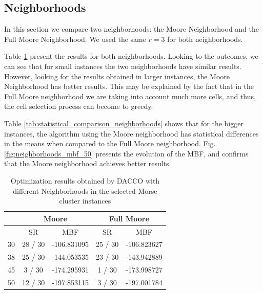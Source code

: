 		\subsection{Neighborhoods}
		
		In this section we compare two neighborhoods: the Moore Neighborhood and the Full Moore Neighborhood. We used the same $r = 3$ for both neighborhoods.
		
		Table \ref{tab:neighborhood_results} present the results for both neighborhoods. Looking to the outcomes, we can see that for small instances the two neighborhoods have similar results. However, looking for the results obtained in larger instances, the Moore Neighborhood has better results. This may be explained by the fact that in the Full Moore neighborhood we are taking into account much more cells, and thus, the cell selection process can become to greedy. 
		
		Table \ref{tab:statistical_comparison_neighborhoods} shows that for the bigger instances, the algorithm using the Moore neighborhood has statistical differences in the means when compared to the Full Moore neighborhood. Fig. \ref{fig:neighborhoods_mbf_50} presents the evolution of the MBF, and confirms that the Moore neighborhood achieves better results. 
		
		\begin{table}[!htdp]
				\begin{center}
					\begin{tabular}{| c | c | c | c | c |}
						\hline
						~ & \multicolumn{2}{c|}{\textbf{Moore}} & \multicolumn{2}{c|}{\textbf{Full Moore}} \\ \hline
						~ & SR & MBF & SR & MBF \\ \hline
						30 & 28 / 30 & -106.831095 & 25 / 30 & -106.823627 \\ \hline
						38 & 25 / 30 & -144.053535 & 23 / 30 & -143.942889 \\ \hline
						45 & 3 / 30 & -174.295931 &  1 / 30 &  -173.998727 \\ \hline
						50 & 12 / 30 & -197.853115 & 3 / 30 &  -197.001784 \\ \hline
					\end{tabular}
					\caption{Optimization results obtained by DACCO with different Neighborhoods in the selected Morse cluster instances}
					\label{tab:neighborhood_results}
				\end{center}
		\end{table}
		
